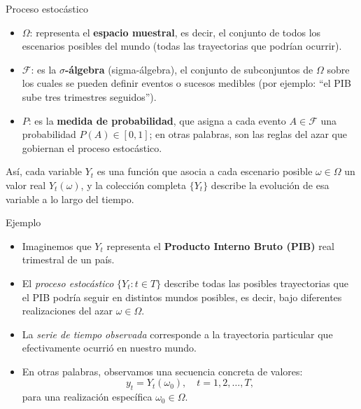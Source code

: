 \documentclass{beamer}
\begin{document}
\begin{frame}{Proceso estocástico}
   \begin{itemize}
    \item \( \Omega \): representa el \textbf{espacio muestral}, es decir, el conjunto de todos los escenarios posibles del mundo 
    (todas las trayectorias que podrían ocurrir).

    \item \( \mathcal{F} \): es la \textbf{$\sigma$-álgebra} (sigma-álgebra), el conjunto de subconjuntos de \( \Omega \) sobre los cuales 
    se pueden definir eventos o sucesos medibles (por ejemplo: ``el PIB sube tres trimestres seguidos'').

    \item \( P \): es la \textbf{medida de probabilidad}, que asigna a cada evento \( A \in \mathcal{F} \) una probabilidad
    \( P(A) \in [0,1] \); en otras palabras, son las reglas del azar que gobiernan el proceso estocástico.
\end{itemize}

Así, cada variable \( Y_t \) es una función que asocia a cada escenario posible \( \omega \in \Omega \) 
un valor real \( Y_t(\omega) \), y la colección completa \( \{Y_t\} \) describe la evolución de esa variable a lo largo del tiempo.
 
\end{frame}

\begin{frame}{Ejemplo}
\small
\begin{itemize}
    \item Imaginemos que \( Y_t \) representa el \textbf{Producto Interno Bruto (PIB)} real trimestral de un país.
    
    \item El \emph{proceso estocástico} \( \{ Y_t : t \in T \} \) describe todas las posibles trayectorias 
    que el PIB podría seguir en distintos mundos posibles, es decir, bajo diferentes realizaciones 
    del azar \( \omega \in \Omega \).
    
    \item La \emph{serie de tiempo observada} corresponde a la trayectoria particular que efectivamente 
    ocurrió en nuestro mundo.
    
    \item En otras palabras, observamos una secuencia concreta de valores:
    \[
    y_t = Y_t(\omega_0), \quad t = 1, 2, \dots, T,
    \]
    para una realización específica \( \omega_0 \in \Omega \).
\end{itemize}
\end{frame}
\end{document}
